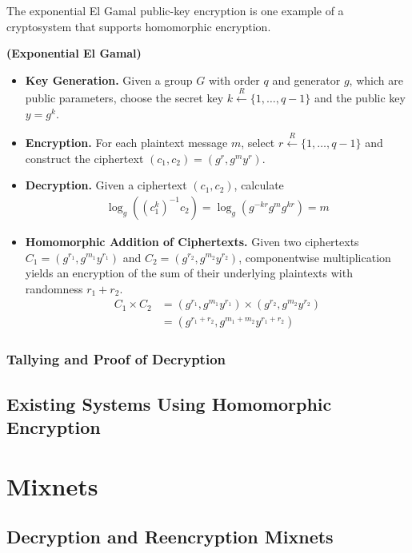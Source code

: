 The exponential El Gamal public-key encryption \cite{elgamal} is one example of a cryptosystem that supports homomorphic encryption.
\begin{definition}
\textbf{(Exponential El Gamal)}
\begin{itemize}
\item \textbf{Key Generation.} Given a group $G$ with order $q$ and generator $g$, which are public parameters, choose the secret key $k \xleftarrow{R} \{1, \dotsc, q-1\}$ and the public key $y = g^k$.
\item \textbf{Encryption.} For each plaintext message $m$, select $r \xleftarrow{R} \{1, \dotsc, q-1\}$ and construct the ciphertext $(c_1, c_2) = (g^r, g^m y^r)$.
\item \textbf{Decryption.} Given a ciphertext $(c_1, c_2)$, calculate
\begin{align*}
\log_g\left((c_1^k)^{-1} c_2\right) = \log_g\left(g^{-kr} g^m g^{kr}\right) = m
\end{align*}
\item \textbf{Homomorphic Addition of Ciphertexts.} Given two ciphertexts $C_1 = (g^{r_1}, g^{m_1} y^{r_1})$ and $C_2 = (g^{r_2}, g^{m_2} y^{r_2})$, componentwise multiplication yields an encryption of the sum of their underlying plaintexts with randomness $r_1 + r_2$.
\begin{align*}
C_1 \times C_2 &= (g^{r_1}, g^{m_1} y^{r_1}) \times (g^{r_2}, g^{m_2} y^{r_2}) \\
&= (g^{r_1 + r_2}, g^{m_1 + m_2} y^{r_1 + r_2})
\end{align*}
\end{itemize}
\end{definition}

\subsubsection{Tallying and Proof of Decryption}

\subsection{Existing Systems Using Homomorphic Encryption} \label{evote:homomorphic:existing}

\section{Mixnets} \label{evote:mixnets}

\subsection{Decryption and Reencryption Mixnets} \label{evote:mixnets:types}

